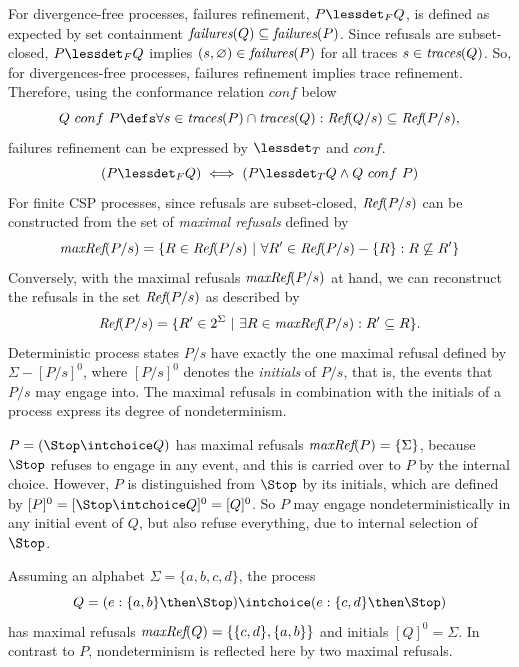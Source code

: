 For divergence-free processes, failures refinement, $P \lessdet_F Q$, is
defined as expected by set containment $\text{\it failures}(Q)\subseteq\text{\it failures}(P)$. Since
refusals are subset-closed, $P \lessdet_F Q$ implies
$(s,\varnothing)\in\text{\it failures}(P)$ for all traces $s\in\text{\it traces}(Q)$. So, for
divergences-free processes, failures refinement implies trace refinement.
Therefore, using the conformance relation $conf$ below
%
\begin{equation}\label{eq:conf}
  Q\ conf\ P \defs \forall s\in \trc(P) \cap \trc(Q): \refs(Q/s)
  \subseteq \refs(P/s),
\end{equation}
%
failures refinement can be expressed by $\lessdet_T$ and $conf$.
%
\begin{equation}\label{thm:fref-tref-conf}
(P \lessdet_F Q) \iff (P \lessdet_T Q \land Q\ conf\ P)
\end{equation}
%
For finite CSP processes, since refusals are
subset-closed, $\text{\it Ref}(P/s)$ can be constructed from the set of \emph{maximal
refusals} defined by
%
\begin{equation}
\text{\it maxRef}(P/s) = \{ R \in\text{\it Ref}(P/s)~|~\forall R'\in \text{\it Ref}(P/s) - \{ R\}: R \not\subseteq R'\}
\end{equation}
%
Conversely, with the maximal refusals $\text{\it maxRef}(P/s)$ at hand, we can
reconstruct the refusals in the set $\text{\it Ref}(P/s)$ as described by
%
\begin{equation}\label{eq:refMaxRef}
\text{\it Ref}(P/s) = \{ R'\in 2^\Sigma~|~\exists R\in \text{\it maxRef}(P/s): R'\subseteq R \}.
\end{equation}
%
Deterministic process states $P/s$ have exactly the one maximal refusal
defined by $\Sigma-[P/s]^0$, where $[P/s]^0$ denotes the \emph{initials} of
$P/s$, that is, the events that $P/s$ may engage into. The maximal refusals
in combination with the initials of a process express its degree of
nondeterminism.
%
\begin{example}
\label{ex:nondetdegree} $P = (\Stop \intchoice Q)$ has maximal refusals
$\text{\it maxRef}(P) = \{ \Sigma \}$, because $\Stop$ refuses to engage in any event,
and this is carried over to $P$ by the internal choice. However, $P$ is
distinguished from $\Stop$ by its initials, which are defined by $[P]^0 = [
\Stop \intchoice Q]^0 = [Q]^0$. So $P$ may engage nondeterministically in any
initial event of $Q$, but also refuse everything, due to internal selection
of $\Stop$.

Assuming an alphabet $\Sigma = \{a,b,c,d\}$, the process
%
$$Q = (e:\{a,b\} \then \Stop) \intchoice (e:\{c,d\} \then \Stop)$$
%
has maximal refusals $\text{\it maxRef}(Q) = \{ \{c,d\}, \{a,b\} \}$ and initials
$[Q]^0=\Sigma$. In contrast to $P$, nondeterminism is reflected here by
two maximal refusals. \xbox
\end{example}



